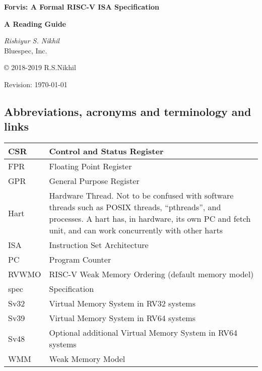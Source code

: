 \documentclass[11pt]{article}
\begin{document}

\pagestyle{empty}

\begin{center}

\vspace*{1.5in}

{\LARGE\bf Forvis: A Formal RISC-V ISA Specification}

\vspace{1cm}

{\large\bf A Reading Guide}

\vspace{2cm}

{\Large \emph{Rishiyur S. Nikhil}} \\

Bluespec, Inc.


\vspace{0.5in}

\copyright{} 2018-2019 R.S.Nikhil

\vspace{1in}

Revision: \today

\end{center}


\newpage



\subsection*{Abbreviations, acronyms and terminology and links}

\begin{tabular}{|l|p{4.5in}|}
\hline
CSR   & Control and Status Register \\
\hline
FPR   & Floating Point Register \\
\hline
GPR   & General Purpose Register \\
\hline
Hart  & Hardware Thread.  Not to be confused with software threads
         such as POSIX threads, ``pthreads'', and processes.
	 A hart has, in hardware, its own PC and fetch unit,
	 and can work concurrently with other harts \\
\hline
ISA   & Instruction Set Architecture \\
\hline
PC    & Program Counter \\
\hline
RVWMO & RISC-V Weak Memory Ordering (default memory model) \\
\hline
spec  & Specification \\
\hline
Sv32  & Virtual Memory System in RV32 systems \\
\hline
Sv39  & Virtual Memory System in RV64 systems \\
\hline
Sv48  & Optional additional Virtual Memory System in RV64 systems \\
\hline
WMM  & Weak Memory Model \\
\hline
\end{tabular}
\end{document}
